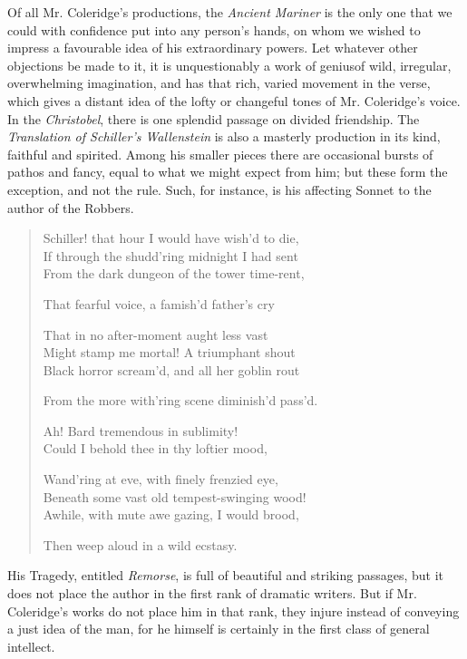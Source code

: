Of all Mr. Coleridge's productions, the \emph{Ancient Mariner} is the
only one that we could with confidence put into any person's
hands, on whom we wished to impress a favourable idea of his
extraordinary powers. Let whatever other objections be made to it,
it is unquestionably a work of genius\textemdash of wild, irregular,
overwhelming imagination, and has that rich, varied movement in
the verse, which gives a distant idea of the lofty or changeful
tones of Mr. Coleridge's voice. In the \emph{Christobel}, there is one
splendid passage on divided friendship. The \emph{Translation of
Schiller's Wallenstein} is also a masterly production in its kind,
faithful and spirited. Among his smaller pieces there are
occasional bursts of pathos and fancy, equal to what we might
expect from him; but these form the exception, and not the
rule. Such, for instance, is his affecting Sonnet to the author of
the Robbers.
\begin{verse}
  Schiller! that hour I would have wish'd to die, \\
  \vin If through the shudd'ring midnight I had sent \\
  \vin From the dark dungeon of the tower time-rent,

  That fearful voice, a famish'd father's cry\textemdash 

  That in no after-moment aught less vast \\
  \vin Might stamp me mortal! A triumphant shout \\
  \vin Black horror scream'd, and all her goblin rout
  
  From the more with'ring scene diminish'd pass'd.

  Ah! Bard tremendous in sublimity! \\
  \vin Could I behold thee in thy loftier mood,
    
  Wand'ring at eve, with finely frenzied eye, \\
  \vin Beneath some vast old tempest-swinging wood! \\
  \vin Awhile, with mute awe gazing, I would brood,
  
  Then weep aloud in a wild ecstasy.
\end{verse}
His Tragedy, entitled \emph{Remorse}, is full of beautiful and striking
passages, but it does not place the author in the first rank of
dramatic writers. But if Mr. Coleridge's works do not place him in
that rank, they injure instead of conveying a just idea of the
man, for he himself is certainly in the first class of general
intellect.

